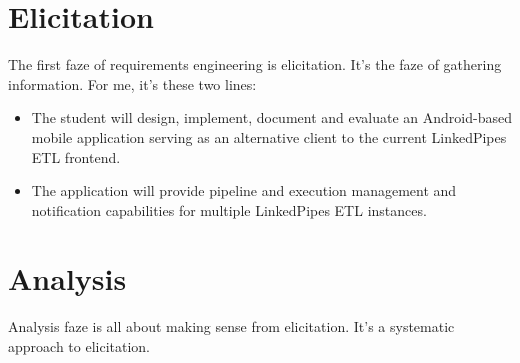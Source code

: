 \section{Elicitation}
The first faze of requirements engineering is elicitation. It's the faze of gathering information. For me, it's these two lines:
\begin{itemize}
    \item The student will design, implement, document and evaluate an Android-based mobile application serving as an alternative client to the current LinkedPipes ETL frontend.
    \item The application will provide pipeline and execution management and notification capabilities for multiple LinkedPipes ETL instances.
\end{itemize}

\section{Analysis}
Analysis faze is all about making sense from elicitation. It's a systematic approach to elicitation.
